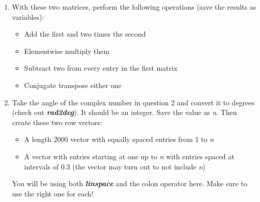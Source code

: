 \documentclass[11pt]{article}
\begin{document}
\begin{enumerate}
\item With these two matrices, perform the following operations (save the results as variables):
	\begin{itemize}
		\item Add the first and two times the second
		\item Elementwise multiply them
		\item Subtract two from every entry in the first matrix
		\item Conjugate transpose either one
	\end{itemize}
\item Take the angle of the complex number in question 2 and convert it to degrees (check out \textit{\textbf{rad2deg}}). It should be an integer. Save the value as \textit{n}. Then create these two row vectors:
	\begin{itemize}
		\item A length 2000 vector with equally spaced entries from 1 to \textit{n}
		\item A vector with entries starting at one up to \textit{n} with entries spaced at intervals of 0.3 (the vector may turn out to not include \textit{n})
	\end{itemize}
You will be using both \textit{\textbf{linspace}} and the colon operator here. Make sure to use the right one for each!
\end{enumerate}
\end{document}

